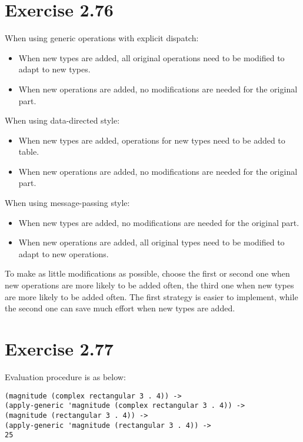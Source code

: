 \documentclass[../main.tex]{subfiles}
\begin{document}
\section{Exercise 2.76}

When using generic operations with explicit
 dispatch:

\begin{itemize}
\item When new types are added, all original
 operations need to be modified to adapt to
 new types.
\item When new operations are added, no
 modifications are needed for the original
 part.
\end{itemize}

When using data-directed style:

\begin{itemize}
\item When new types are added, operations
 for new types need to be added to table.
\item When new operations are added, no
 modifications are needed for the original
 part.
\end{itemize}

When using message-passing style:

\begin{itemize}
\item When new types are added, no modifications
 are needed for the original part.
\item When new operations are added, all
 original types need to be modified to adapt to
 new operations.
\end{itemize}

To make as little modifications as possible,
 choose the first or second one when new operations
 are more likely to be added often, the third
 one when new types are more likely to be added
 often. The first strategy is easier to implement,
 while the second one can save much effort when
 new types are added.

\section{Exercise 2.77}

Evaluation procedure is as below:

\begin{lstlisting}
(magnitude (complex rectangular 3 . 4)) ->
(apply-generic 'magnitude (complex rectangular 3 . 4)) ->
(magnitude (rectangular 3 . 4)) ->
(apply-generic 'magnitude (rectangular 3 . 4)) ->
25
\end{lstlisting}
\end{document}
